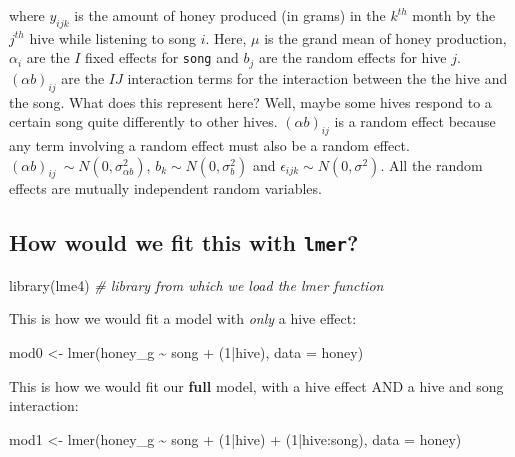 \documentclass[
  openany]{book}
\newenvironment{Shaded}{\begin{snugshade}}{\end{snugshade}}
\newcommand{\AttributeTok}[1]{\textcolor[rgb]{0.77,0.63,0.00}{#1}}
\newcommand{\CommentTok}[1]{\textcolor[rgb]{0.56,0.35,0.01}{\textit{#1}}}
\newcommand{\DecValTok}[1]{\textcolor[rgb]{0.00,0.00,0.81}{#1}}
\newcommand{\FunctionTok}[1]{\textcolor[rgb]{0.00,0.00,0.00}{#1}}
\newcommand{\NormalTok}[1]{#1}
\newcommand{\OtherTok}[1]{\textcolor[rgb]{0.56,0.35,0.01}{#1}}
\newcommand{\SpecialCharTok}[1]{\textcolor[rgb]{0.00,0.00,0.00}{#1}}
\begin{document}
where \(y_{ijk}\) is the amount of honey produced (in grams) in the \(k^{th}\) month by the \(j^{th}\) hive while listening to song \(i\). Here, \(\mu\) is the grand mean of honey production, \(\alpha_i\) are the \(I\) fixed effects for \texttt{song} and \(b_j\) are the random effects for hive \(j\). \((\alpha b)_{ij}\) are the \(IJ\) interaction terms for the interaction between the the hive and the song. What does this represent here? Well, maybe some hives respond to a certain song quite differently to other hives. \((\alpha b)_{ij}\) is a random effect because any term involving a random effect must also be a random effect. \((\alpha b)_{ij} ~ \sim N(0, \sigma^2_{\alpha b})\), \(b_k \sim N(0, \sigma_b^2)\) and \(\epsilon_{ijk} \sim N(0, \sigma^2)\). All the random effects are mutually independent random variables.

\hypertarget{how-would-we-fit-this-with-lmer}{%
\subsection{\texorpdfstring{How would we fit this with \texttt{lmer}?}{How would we fit this with lmer?}}\label{how-would-we-fit-this-with-lmer}}

\begin{Shaded}
\begin{Highlighting}[]
\FunctionTok{library}\NormalTok{(lme4) }\CommentTok{\# library from which we load the lmer function}
\end{Highlighting}
\end{Shaded}

This is how we would fit a model with \emph{only} a hive effect:

\begin{Shaded}
\begin{Highlighting}[]
\NormalTok{mod0 }\OtherTok{\textless{}{-}} \FunctionTok{lmer}\NormalTok{(honey\_g }\SpecialCharTok{\textasciitilde{}}\NormalTok{ song }\SpecialCharTok{+}\NormalTok{ (}\DecValTok{1}\SpecialCharTok{|}\NormalTok{hive), }\AttributeTok{data =}\NormalTok{ honey)}
\end{Highlighting}
\end{Shaded}

This is how we would fit our \textbf{full} model, with a hive effect AND a hive and song interaction:

\begin{Shaded}
\begin{Highlighting}[]
\NormalTok{mod1 }\OtherTok{\textless{}{-}} \FunctionTok{lmer}\NormalTok{(honey\_g }\SpecialCharTok{\textasciitilde{}}\NormalTok{ song }\SpecialCharTok{+}\NormalTok{ (}\DecValTok{1}\SpecialCharTok{|}\NormalTok{hive) }\SpecialCharTok{+}\NormalTok{ (}\DecValTok{1}\SpecialCharTok{|}\NormalTok{hive}\SpecialCharTok{:}\NormalTok{song), }\AttributeTok{data =}\NormalTok{ honey)}
\end{Highlighting}
\end{Shaded}
\end{document}
